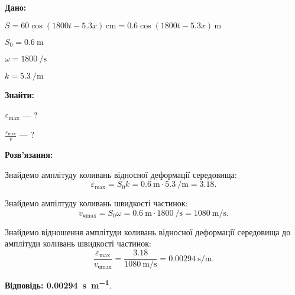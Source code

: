 \documentclass[a4paper,oneside,DIV=9,12pt]{scrartcl}
\newcommand\given{\noindent\textbf{Дано:}}
\newcommand\find{\noindent\textbf{Знайти:}}
\newcommand\solution{\noindent\textbf{Розв'язання:}}
\newcommand\answer[1]{\noindent\textbf{Відповідь: #1}}
\begin{document}
	
	\given\par
	$S = \num{60} \cos (1800t - \num{5,3}x)\, \si{\centi\metre} = \num{0,6} \cos (1800t - \num{5,3}x)\, \si{\metre}$
	
	
	$S_0 = \SI{0,6}{\metre}$
	
	
	$\omega = \SI{1800}{\per\second}$
	
	
	$k = \SI{5,3}{\per\metre}$
	
	\find\par
	$\varepsilon_{\text{max}}$ --- ?
	
	$\frac{\varepsilon_{\text{max}}}{v}$ --- ?
	
	\solution\par
	
	Знайдемо амплітуду коливань відносної деформації середовища:
	\[
		\varepsilon_{\text{max}} = S_{0}k = \SI{0,6}{\metre} \cdot \SI{5,3}{\per\metre} = \num{3,18}.
	\]
	
	Знайдемо ампілтуду коливань швидкості частинок:
	\[
		v_{\text{чmax}} = S_0 \omega = \SI{0,6}{\metre} \cdot \SI{1800}{\per\second} = \SI{1080}{\metre\per\second}.
	\]
	
	Знайдемо відношення амплітуди коливань відносної деформації середовища до амплітуди коливань швидкості частинок:
	\[
		\frac{\varepsilon_{\text{max}}}{v_{\text{чmax}}} = \frac{\num{3,18}}{\SI{1080}{\metre\per\second}} = \SI{0,00294}{\second\per\metre}.
	\]
	
	\answer{\SI{0,00294}{\second\per\metre}}.
	
\end{document}

